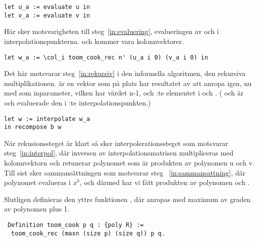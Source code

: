 \begin{lstlisting}
let u_a := evaluate u in
let v_a := evaluate v in
\end{lstlisting}

Här sker motsvarigheten till steg~\ref{in:evaluering}, evalueringen av 
och  i interpolationspunkterna.  och  kommer vara
kolonnvektorer.

\begin{lstlisting}
let w_a := \col_i toom_cook_rec n' (u_a i 0) (v_a i 0) in
\end{lstlisting}

Det här motsvarar steg~\ref{in:rekursiv} i den informella algoritmen, den
rekursiva multiplikationen.  är en vektor som på plats  har
resultatet av att anropa  igen, nu med  som inparameter,
vilken har värdet n-1, och :te elementet i  och . ( och  är  och  evaluerade den i :te
interpolationspunkten.)
\begin{lstlisting}
let w := interpolate w_a
in recompose b w
\end{lstlisting}
När rekusionssteget är klart så sker interpolerationssteget som motsvarar
steg~\ref{in:interpol}, där inversen av interpolationsmatrisen multipliceras
med kolonnvektorn  och retunerar polynomet  som är produkten av
polynomen u och v. Till sist sker sammansättningen som motsvarar steg~
\ref{in:sammansattning}, där polynomet  evalueras i $x^b$, och därmed har
vi fått produkten av polynomen  och .

Slutligen definieras den yttre funktionen , där  anropas med
maximum av graden av polynomen plus 1.
\begin{lstlisting}
 Definition toom_cook p q : {poly R} :=
  toom_cook_rec (maxn (size p) (size q)) p q.
\end{lstlisting}
